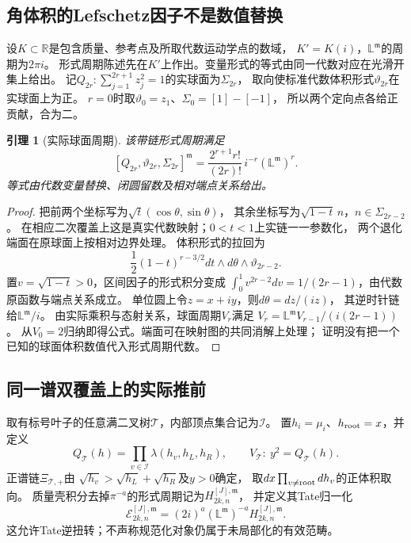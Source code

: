 \documentclass[11pt,a4paper]{ctexart}
\theoremstyle{cnplain}\newtheorem{theorem}{定理}[section]
\newtheorem{lemma}[theorem]{引理}
\theoremstyle{definition}\newtheorem{definition}[theorem]{定义}
\theoremstyle{remark}\newtheorem{remark}[theorem]{注}
\begin{document}
\subsection{角体积的Lefschetz因子不是数值替换}

设$K\subset\mathbb R$是包含质量、参考点及所取代数运动学点的数域，
$K'=K(i)$，$\mathbb L^{\mathfrak m}$的周期为$2\pi i$。
形式周期陈述先在$K'$上作出。变量形式的等式由同一代数对应在光滑开集上给出。
记$Q_{2r}:\sum_{j=1}^{2r+1}z_j^2=1$的实球面为$\Sigma_{2r}$，
取向使标准代数体积形式$\vartheta_{2r}$在实球面上为正。
$r=0$时取$\vartheta_0=z_1$、$\Sigma_0=[1]-[-1]$，
所以两个定向点各给正贡献，合为二。

\begin{lemma}[实际球面周期]\label{lem:actualsphereperiod}
该带链形式周期满足
\begin{equation}\label{eq:actualsphereperiod}
 [Q_{2r},\vartheta_{2r},\Sigma_{2r}]^{\mathfrak m}
 =\frac{2^{r+1}r!}{(2r)!}\,i^{-r}(\mathbb L^{\mathfrak m})^r.
\end{equation}
等式由代数变量替换、闭圆留数及相对端点关系给出。
\end{lemma}
\begin{proof}
把前两个坐标写为$\sqrt t(\cos\theta,\sin\theta)$，
其余坐标写为$\sqrt{1-t}\,n$，$n\in\Sigma_{2r-2}$。
在相应二次覆盖上这是真实代数映射；$0<t<1$上实链一一参数化，
两个退化端面在原球面上按相对边界处理。
体积形式的拉回为
\[
 \frac12(1-t)^{r-3/2}dt\wedge d\theta\wedge\vartheta_{2r-2}.
\]
置$v=\sqrt{1-t}>0$，区间因子的形式积分变成
$\int_0^1v^{2r-2}dv=1/(2r-1)$，由代数原函数与端点关系成立。
单位圆上令$z=x+iy$，则$d\theta=dz/(iz)$，
其逆时针链给$\mathbb L^{\mathfrak m}/i$。
由实际乘积与态射关系，球面周期$V_r$满足
$V_r=\mathbb L^{\mathfrak m}V_{r-1}/(i(2r-1))$。
从$V_0=2$归纳即得公式。端面可在映射图的共同消解上处理；
证明没有把一个已知的球面体积数值代入形式周期代数。
\end{proof}

\subsection{同一谱双覆盖上的实际推前}

取有标号叶子的任意满二叉树$\mathcal T$，内部顶点集合记为$\mathcal I$。
置$h_i=\mu_i$、$h_{\rm root}=x$，并定义
\[
 Q_{\mathcal T}(h)=\prod_{v\in\mathcal I}\lambda(h_v,h_L,h_R),\qquad
 V_{\mathcal T}:\ y^2=Q_{\mathcal T}(h).
\]
正谱链$\Xi_{\mathcal T,+}$由
$\sqrt{h_v}>\sqrt{h_L}+\sqrt{h_R}$及$y>0$确定，
取$dx\prod_{v\ne{\rm root}}dh_v$的正体积取向。
质量壳积分去掉$\pi^{-a}$的形式周期记为$H_{2k,n}^{[J],\mathfrak m}$，
并定义其Tate归一化
\[
 \mathcal E_{2k,n}^{[J],\mathfrak m}
    =(2i)^a(\mathbb L^{\mathfrak m})^{-a}H_{2k,n}^{[J],\mathfrak m}.
\]
这允许Tate逆扭转；不声称规范化对象仍属于未局部化的有效范畴。
\end{document}
